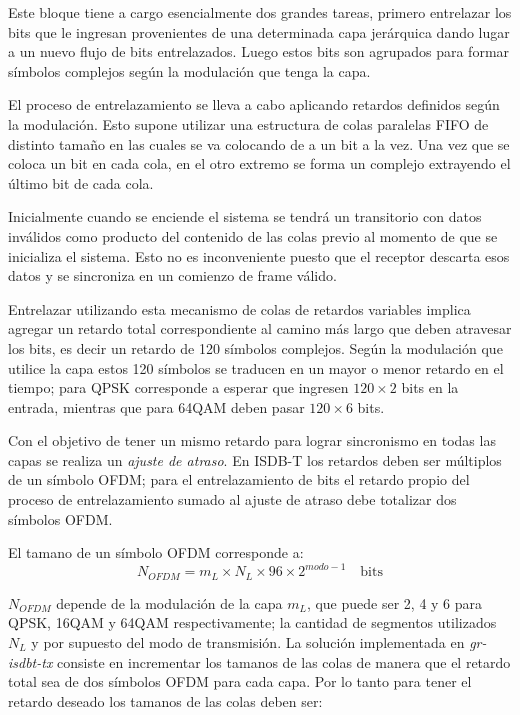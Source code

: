 Este bloque tiene a cargo esencialmente dos grandes tareas, primero entrelazar los bits que le ingresan provenientes de una determinada capa jerárquica dando lugar a un nuevo flujo de bits entrelazados. Luego estos bits son agrupados para formar símbolos complejos según la modulación que tenga la capa.

El proceso de entrelazamiento se lleva a cabo aplicando retardos definidos según la modulación. Esto supone utilizar una estructura de colas paralelas FIFO de distinto tamaño en las cuales se va colocando de a un bit a la vez. Una vez que se coloca un bit en cada cola, en el otro extremo se forma un complejo extrayendo el último bit de cada cola.

Inicialmente cuando se enciende el sistema se tendrá un transitorio con datos inválidos como producto del contenido de las colas previo al momento de que se inicializa el sistema. Esto no es inconveniente puesto que el receptor descarta esos datos y se sincroniza en un comienzo de frame válido.

Entrelazar utilizando esta mecanismo de colas de retardos variables implica agregar un retardo total correspondiente al camino más largo que deben atravesar los bits, es decir un retardo de 120 símbolos complejos. Según la modulación que utilice la capa estos 120 símbolos se traducen en un mayor o menor retardo en el tiempo; para QPSK corresponde a esperar que ingresen $120 \times 2$ bits en la entrada, mientras que para 64QAM deben pasar $120 \times 6$ bits.

Con el objetivo de tener un mismo retardo para lograr sincronismo en todas las capas se realiza un \textit{ajuste de atraso}. En ISDB-T los retardos deben ser m\'ultiplos de un s\'imbolo OFDM; para el entrelazamiento de bits el retardo propio del proceso de entrelazamiento sumado al ajuste de atraso debe totalizar dos s\'imbolos OFDM.

El tamano de un s\'imbolo OFDM corresponde a: 
\begin{equation}
N_{OFDM} = m_L \times N_L \times 96 \times 2^{modo-1} \quad \text{bits}
\end{equation}

$N_{OFDM}$ depende de la modulaci\'on de la capa $m_L$, que puede ser 2, 4 y 6 para QPSK, 16QAM y 64QAM respectivamente; la cantidad de segmentos utilizados $N_L$ y por supuesto del modo de transmisi\'on. La soluci\'on implementada en \textit{gr-isdbt-tx} consiste en incrementar los tamanos de las colas de manera que el retardo total sea de dos s\'imbolos OFDM para cada capa. Por lo tanto para tener el retardo deseado los tamanos de las colas deben ser:

